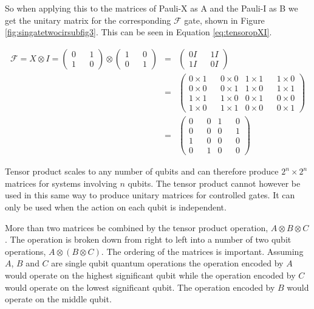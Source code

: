 So when applying this to the matrices of Pauli-X as A and the Pauli-I as B we get the unitary matrix for the corresponding $\mathcal{F}$ gate, shown in Figure \ref{fig:singatetwocirsubfig3}.
This can be seen in Equation \ref{eq:tensoropXI}.

\begin{eqnarray}
  \mathcal{F} =
X \otimes I =
\begin{pmatrix}
0 && 1\\
1 && 0
\end{pmatrix}
\otimes
\begin{pmatrix}
1 && 0 \\
0 && 1
\end{pmatrix} & = & \begin{pmatrix}
0I && 1I \\
1I && 0I
\end{pmatrix}  \nonumber \\
   & = & \begin{pmatrix}
0\times{1} && 0\times{0} & 1\times{1} && 1\times{0}\\
0\times{0} && 0\times{1} & 1\times{0} && 1\times{1}\\
1\times{1} && 1\times{0} & 0\times{1} && 0\times{0}\\
1\times{0} && 1\times{1} & 0\times{0} && 0\times{1}
\end{pmatrix} \nonumber  \\
   & = & \begin{pmatrix}
0 && 0 & 1 && 0\\
0 && 0 & 0 && 1\\
1 && 0 & 0 && 0\\
0 && 1 & 0 && 0
\end{pmatrix}
\label{eq:tensoropXI}
\end{eqnarray}

Tensor product scales to any number of qubits and can therefore produce $2^n\times{2^n}$ matrices for systems involving $n$ qubits.
The tensor product cannot however be used in this same way to produce unitary matrices for controlled gates.
It can only be used when the action on each qubit is independent.

More than two matrices be combined by the tensor product operation, $A\otimes{B}\otimes{C}$.
The operation is broken down from right to left into a number of two qubit operations, $A\otimes(B\otimes{C})$.
The ordering of the matrices is important.
Assuming $A$, $B$ and $C$ are single qubit quantum operations the operation encoded by $A$ would operate on the highest significant qubit while the operation encoded by $C$ would operate on the lowest significant qubit.
The operation encoded by $B$ would operate on the middle qubit.

